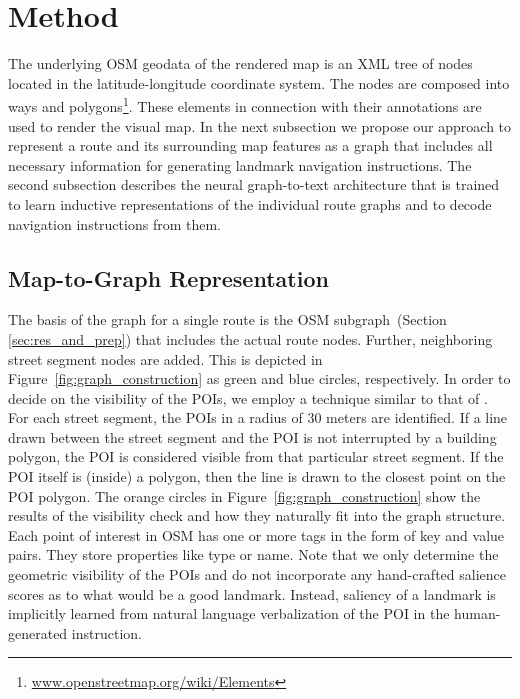 \documentclass[11pt,a4paper]{article}
\begin{document}
\section{Method}

The underlying OSM geodata of the rendered map is an XML tree of nodes located in the latitude-longitude coordinate system. The nodes are composed into ways and polygons\footnote{\url{www.openstreetmap.org/wiki/Elements}}. These elements in connection with their annotations are used to render the visual map.
In the next subsection we propose our approach to represent a route and its surrounding map features as a graph that includes all necessary information for generating landmark navigation instructions. The second subsection describes the neural graph-to-text architecture that is trained to learn inductive representations of the individual route graphs and to decode navigation instructions from them.

\subsection{Map-to-Graph Representation}

The basis of the graph for a single route is the OSM subgraph~(Section \ref{sec:res_and_prep}) that includes the actual route nodes. Further, neighboring street segment nodes are added. This is depicted in Figure~\ref{fig:graph_construction} as green and blue circles, respectively. In order to decide on the visibility of the POIs, we employ a technique similar to that of \citet{rousell-zipf-2017-towards}. For each street segment, the POIs in a radius of 30 meters are identified. If a line drawn between the street segment and the POI is not interrupted by a building polygon, the POI is considered visible from that particular street segment. If the POI itself is (inside) a polygon, then the line is drawn to the closest point on the POI polygon. The orange circles in Figure~\ref{fig:graph_construction} show the results of the visibility check and how they naturally fit into the graph structure. Each point of interest in OSM has one or more tags in the form of key and value pairs. They store properties like type or name.
Note that we only determine the geometric visibility of the POIs and do not incorporate any hand-crafted salience scores as to what would be a good landmark. Instead, saliency of a landmark is implicitly learned from natural language verbalization of the POI in the human-generated instruction. 
\end{document}
